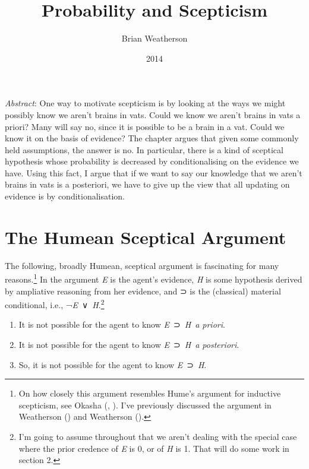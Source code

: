 \documentclass[
  11pt,
  letterpaper,
  DIV=11,
  numbers=noendperiod,
  twoside]{scrartcl}
\title{Probability and Scepticism}
\author{Brian Weatherson}
\date{2014}
\providecommand{\tightlist}{%
  \setlength{\itemsep}{0pt}\setlength{\parskip}{0pt}}
\renewenvironment{abstract}
 {\vspace{-1.25cm}
 \quotation\small\noindent\emph{Abstract}:}
 {\endquotation}
\begin{document}
\maketitle
\begin{abstract}
One way to motivate scepticism is by looking at the ways we might
possibly know we aren't brains in vats. Could we know we aren't brains
in vats a priori? Many will say no, since it is possible to be a brain
in a vat. Could we know it on the basis of evidence? The chapter argues
that given some commonly held assumptions, the answer is no. In
particular, there is a kind of sceptical hypothesis whose probability is
decreased by conditionalising on the evidence we have. Using this fact,
I argue that if we want to say our knowledge that we aren't brains in
vats is a posteriori, we have to give up the view that all updating on
evidence is by conditionalisation.
\end{abstract}


\section{The Humean Sceptical
Argument}\label{the-humean-sceptical-argument}

The following, broadly Humean, sceptical argument is fascinating for
many reasons.\footnote{On how closely this argument resembles Hume's
  argument for inductive scepticism, see Okasha
  (, ).
  I've previously discussed the argument in Weatherson
  () and Weatherson
  ().} In the argument \emph{E} is
the agent's evidence, \emph{H} is some hypothesis derived by ampliative
reasoning from her evidence, and ⊃ is the (classical) material
conditional, i.e., ¬\emph{E}~∨~\emph{H}.\footnote{I'm going to assume
  throughout that we aren't dealing with the special case where the
  prior credence of \emph{E} is 0, or of \emph{H} is 1. That will do
  some work in section 2.}

\begin{enumerate}
\def\labelenumi{\arabic{enumi}.}
\tightlist
\item
  It is not possible for the agent to know \emph{E}~⊃~\emph{H}~\emph{a
  priori}.
\item
  It is not possible for the agent to know \emph{E}~⊃~\emph{H}~\emph{a
  posteriori}.
\item
  So, it is not possible for the agent to know \emph{E}~⊃~\emph{H}.
\end{enumerate}
\end{document}
